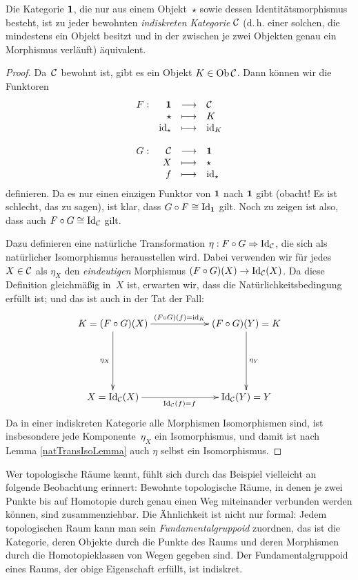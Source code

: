 \begin{bsp}
Die Kategorie $\mathbf{1}$, die nur aus einem Objekt~$\star$ sowie dessen
Iden\-ti\-täts\-mor\-phis\-mus besteht, ist zu jeder bewohnten
\emph{indiskreten Kategorie} $\mathcal{C}$ (d.\,h. einer solchen, die mindestens ein
Objekt besitzt und in der zwischen je zwei Objekten genau ein Morphismus
verläuft) äquivalent. 
\end{bsp}
\begin{proof}
Da~$\mathcal{C}$ bewohnt ist, gibt es ein Objekt $K \in \operatorname{Ob} \mathcal{C}$. Dann können wir die Funktoren
\[ \begin{array}{@{}rrcl@{}}
  F: & \Eins &\longrightarrow& \C \\
  & \star &\longmapsto& K \\
  & \id_\star &\longmapsto& \id_K \\\\
  G: & \C &\longrightarrow& \Eins \\
  & X &\longmapsto& \star \\
  & f &\longmapsto& \id_\star
\end{array} \]
definieren.
Da es nur einen einzigen Funktor von $\mathbf{1}$ nach $\mathbf{1}$ gibt (obacht! Es ist schlecht, das zu sagen), ist klar, dass $G \circ F \cong \mathrm{Id}_{\mathbf{1}}$ gilt. Noch zu zeigen ist also, dass auch $F \circ G \cong \mathrm{Id}_{\mathcal{C}}$ gilt.

Dazu definieren eine natürliche Transformation $\eta: F \circ G \Rightarrow
\mathrm{Id}_{\mathcal{C}}$, die sich als natürlicher Isomorphismus herausstellen wird. Dabei
verwenden wir für jedes $X \in \mathcal{C}$ als $\eta_X$ den \emph{eindeutigen}
Morphismus $(F\circ G) (X) \to \mathrm{Id}_{\mathcal{C}}(X)$. Da diese Definition gleichmäßig
in~$X$ ist, erwarten wir, dass die Natürlichkeitsbedingung erfüllt ist; und das
ist auch in der Tat der Fall:
\[ \xymatrixcolsep{5pc}\xymatrixrowsep{5pc}\xymatrix{
  K = (F \circ G)(X) \ar[r]^{(F \circ G)(f)=\id_K} \ar[d]_{\eta_X} & (F \circ G)(Y) = K \ar[d]^{\eta_Y} \\
  X = \Id_\C (X) \ar[r]_{\Id_\C(f)=f} & \Id_\C (Y) = Y
} \]
Da in einer indiskreten Kategorie alle Morphismen Isomorphismen sind, ist
insbesondere jede Komponente~$\eta_X$ ein Isomorphismus, und damit ist nach
Lemma \ref{natTransIsoLemma} auch $\eta$ selbst ein Isomorphismus.
\end{proof}

\begin{bem}Wer topologische Räume kennt, fühlt sich durch das Beispiel
vielleicht an folgende Beobachtung erinnert: Bewohnte topologische Räume, in
denen je zwei Punkte bis auf Homotopie durch genau einen Weg miteinander
verbunden werden können, sind zusammenziehbar. Die Ähnlichkeit ist nicht nur
formal: Jedem topologischen Raum kann man sein \emph{Fundamentalgruppoid}
zuordnen, das ist die Kategorie, deren Objekte durch die Punkte des Raums und
deren Morphismen durch die Homotopieklassen von Wegen gegeben sind. Der
Fundamentalgruppoid eines Raums, der obige Eigenschaft erfüllt, ist
indiskret.\end{bem}

